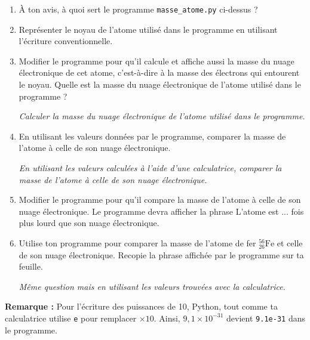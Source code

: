 \documentclass[12pt,a4paper]{article}
\begin{document}
\begin{enumerate}
\item À ton avis, à quoi sert le programme \texttt{masse\_atome.py} ci-dessus ?

\item Représenter le noyau de l'atome utilisé dans le programme en utilisant l'écriture conventionnelle.

\item
\label{quest:alt1}
Modifier le programme pour qu'il calcule et affiche aussi la masse du nuage électronique de cet atome, c'est-à-dire à la masse des électrons qui entourent le noyau.
Quelle est la masse du nuage électronique de l'atome utilisé dans le programme ?

\emph{Calculer la masse du nuage électronique de l'atome utilisé dans le programme.}

\item
\label{quest:alt2}
En utilisant les valeurs données par le programme, comparer la masse de l'atome à celle de son nuage électronique.

\emph{En utilisant les valeurs calculées à l'aide d'une calculatrice, comparer la masse de l'atome à celle de son nuage électronique.}

\item
\label{quest:python}
Modifier le programme pour qu'il compare la masse de l'atome à celle de son nuage électronique.
Le programme devra afficher la phrase \og L'atome est ... fois plus lourd que son nuage électronique. \fg{}

\item
\label{quest:alt3}
Utilise ton programme pour comparer la masse de l'atome de fer $_\text{26}^\text{56}\text{Fe}$ et celle de son nuage électronique.
Recopie la phrase affichée par le programme sur ta feuille.

\emph{Même question mais en utilisant les valeurs trouvées avec la calculatrice.}
\end{enumerate}
\textbf{Remarque :} Pour l'écriture des puissances de 10, Python, tout comme ta calculatrice utilise \texttt{e} pour remplacer $\times 10$.
Ainsi, $9{,}1\times10^{-31}$ devient \texttt{9.1e-31} dans le programme.
\end{document}
